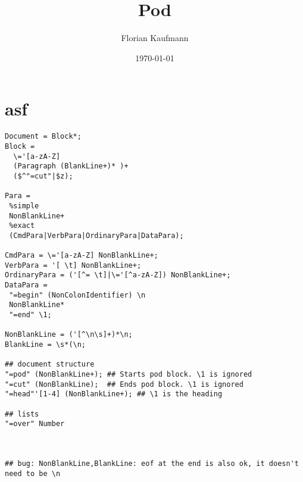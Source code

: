 \documentclass{article}
\begin{document}
\author{Florian Kaufmann}
\title{Pod}
\date{\today}
\maketitle
\tableofcontents

\section{asf}

\begin{verbatim}
Document = Block*;
Block =
  \='[a-zA-Z]
  (Paragraph (BlankLine+)* )+
  ($^"=cut"|$z);
        
Para =
 %simple        
 NonBlankLine+
 %exact
 (CmdPara|VerbPara|OrdinaryPara|DataPara);        
        
CmdPara = \='[a-zA-Z] NonBlankLine+;
VerbPara = '[ \t] NonBlankLine+;         
OrdinaryPara = ('[^= \t]|\='[^a-zA-Z]) NonBlankLine+;
DataPara =
 "=begin" (NonColonIdentifier) \n
 NonBlankLine*
 "=end" \1; 
        
NonBlankLine = ('[^\n\s]+)*\n;        
BlankLine = \s*(\n;

## document structure
"=pod" (NonBlankLine+); ## Starts pod block. \1 is ignored
"=cut" (NonBlankLine);  ## Ends pod block. \1 is ignored
"=head"'[1-4] (NonBlankLine+); ## \1 is the heading
              
## lists              
"=over" Number
          
          
          
## bug: NonBlankLine,BlankLine: eof at the end is also ok, it doesn't need to be \n
\end{verbatim}
\end{document}

